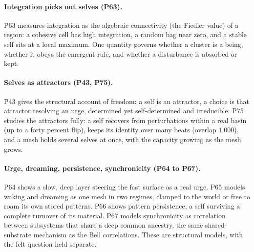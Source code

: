 \paragraph{Integration picks out selves (P63).}
P63 measures integration as the algebraic connectivity (the Fiedler value) of a region: a cohesive
cell has high integration, a random bag near zero, and a stable self sits at a local maximum. One
quantity governs whether a cluster is a being, whether it obeys the emergent rule, and whether a
disturbance is absorbed or kept.

\paragraph{Selves as attractors (P43, P75).}
P43 gives the structural account of freedom: a self is an attractor, a choice is that attractor
resolving an urge, determined yet self-determined and irreducible. P75 studies the attractors fully:
a self recovers from perturbations within a real basin (up to a forty percent flip), keeps its
identity over many beats (overlap $1.000$), and a mesh holds several selves at once, with the
capacity growing as the mesh grows.

\paragraph{Urge, dreaming, persistence, synchronicity (P64 to P67).}
P64 shows a slow, deep layer steering the fast surface as a real urge. P65 models waking and
dreaming as one mesh in two regimes, clamped to the world or free to roam its own stored patterns.
P66 shows pattern persistence, a self surviving a complete turnover of its material. P67 models
synchronicity as correlation between subsystems that share a deep common ancestry, the same
shared-substrate mechanism as the Bell correlations. These are structural models, with the felt
question held separate.
